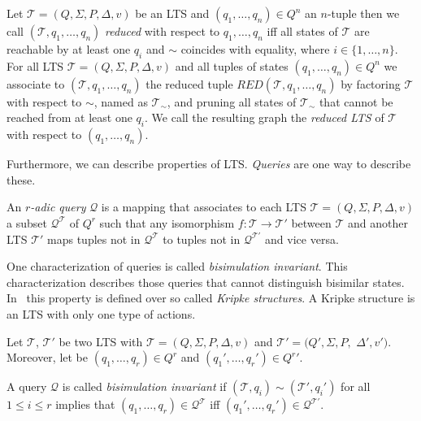 \begin{definition}
    \label{definition:reduced_lts}
    Let $\mathcal{T} = (Q, \Sigma, P, \Delta, v)$ be an LTS and $(q_1, \dots, q_n) \in Q^n$ an $n$-tuple then we call $
    (\mathcal{T}, q_1, \dots, q_n)$ \emph{reduced} with respect to $q_1, \dots, q_n$ iff all states of $\mathcal{T}$ are reachable by at
    least one $q_i$ and $\sim$ coincides with equality, where $i \in \{1, \dots, n\}$. For all LTS $\mathcal{T} =
    (Q, \Sigma, P, \Delta, v)$ and all tuples of states $(q_1, \dots, q_n) \in Q^n$ we associate to $(\mathcal{T}, q_1,
    \dots, q_n)$ the reduced tuple $RED(\mathcal{T}, q_1, \dots, q_n)$ by factoring $\mathcal{T}$ with respect to
    $\sim$, named as $\mathcal{T}_\sim$, and pruning all states of $\mathcal{T}_\sim$ that cannot be reached from at least one $q_i$. We call the resulting
    graph the \emph{reduced LTS} of $\mathcal{T}$ with respect to $(q_1, \dots, q_n)$.
\end{definition}

Furthermore, we can describe properties of LTS. \textit{Queries} are one way to describe these.

\begin{definition}{\cite{otto1999bisimulation}}
    \label{definition:query}
    An \emph{$r$-adic query} $\mathcal{Q}$ is a mapping that associates to each LTS $\mathcal{T} = (Q, \Sigma, P,
    \Delta, v)$ a subset $\mathcal{Q}^{\mathcal{T}}$ of $Q^r$ such that any isomorphism $f:
    \mathcal{T} \to \mathcal{T}'$ between $\mathcal{T}$ and another LTS $\mathcal{T'}$ maps tuples not in $\mathcal{Q}^{\mathcal{T}}$ to tuples not in $\mathcal{Q}^{\mathcal{T'}}$ and vice versa.
\end{definition}

One characterization of queries is called \textit{bisimulation invariant}. This characterization describes those queries that
cannot distinguish bisimilar states. In~\cite{otto1999bisimulation} this property is defined over so called
\textit{Kripke structures}. A Kripke structure is an LTS with only one type of actions.

\begin{definition}
    \label{definition:bisimulationInvariant}
    Let $\mathcal{T}$, $\mathcal{T}'$ be two LTS with $\mathcal{T} = (Q, \Sigma, P, \Delta, v)$
    and $\mathcal{T}' = (Q', \Sigma, P,$ $ \Delta', v')$. Moreover, let be $(q_1, \dots, q_r) \in Q^r$ and $({q_1}',
    \dots, {q_r}') \in {Q^r}'$.

    A query $\mathcal{Q}$ is called \emph{bisimulation invariant} if $(\mathcal{T}, q_i) \sim (\mathcal{T}', q_i')$
    for all $1 \leq i \leq r$ implies that $(q_1, \dots, q_r) \in \mathcal{Q}^\mathcal{T}$ iff $({q_1}',
    \dots, {q_r}') \in \mathcal{Q}^{{\mathcal{T}}'}$.
\end{definition}


